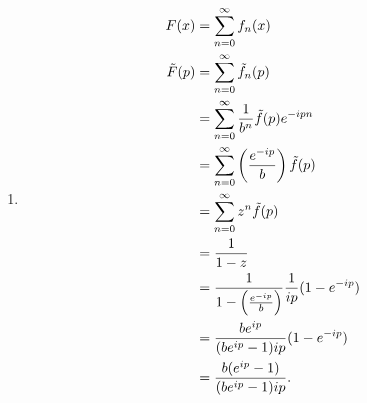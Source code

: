 \documentclass[10pt, a4paper]{article}
\begin{document}
\begin{problem}[$2024$]
\begin{solution}
\begin{enumerate}[label = (\alph*)]
            \item
            \begin{align*}
                F(x) &= \infsum[n = 0]f_n(x) \\
                \tilde{F}(p) &= \infsum[n = 0]\tilde{f}_n(p) \\
                &= \infsum[n = 0]\frac{1}{b ^ n}\tilde{f}(p)e ^ {-ipn} \\
                &= \infsum[n = 0]\left(\frac{e ^ {-ip}}{b}\right)\tilde{f}(p) \\
                &= \infsum[n = 0]z ^ n\tilde{f}(p) \\
                &= \frac{1}{1 - z} \\
                &= \frac{1}{1 - \left(\frac{e ^ {-ip}}{b}\right)}\frac{1}{ip}(1 - e ^ {-ip}) \\
                &= \frac{be ^ {ip}}{(be ^ {ip} - 1)ip}(1 - e ^ {-ip}) \\
                &= \frac{b(e ^ {ip} - 1)}{(be ^ {ip} - 1)ip}.
            \end{align*}
        \end{enumerate}
    \end{solution}
\end{problem}
\end{document}
